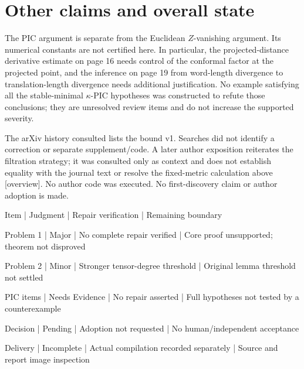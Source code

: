 \documentclass[10pt]{article}
\begin{document}
\section*{Other claims and overall state}
The PIC argument is separate from the Euclidean \(Z\)-vanishing argument. Its numerical constants are not certified here. In particular, the projected-distance derivative estimate on page 16 needs control of the conformal factor at the projected point, and the inference on page 19 from word-length divergence to translation-length divergence needs additional justification. No example satisfying all the stable-minimal \(\kappa\)-PIC hypotheses was constructed to refute those conclusions; they are unresolved review items and do not increase the supported severity.\par
The arXiv history consulted lists the bound v1. Searches did not identify a correction or separate supplement/code. A later author exposition reiterates the filtration strategy; it was consulted only as context and does not establish equality with the journal text or resolve the fixed-metric calculation above [overview]. No author code was executed. No first-discovery claim or author adoption is made.\par
Item | Judgment | Repair verification | Remaining boundary\par
Problem 1 | Major | No complete repair verified | Core proof unsupported; theorem not disproved\par
Problem 2 | Minor | Stronger tensor-degree threshold | Original lemma threshold not settled\par
PIC items | Needs Evidence | No repair asserted | Full hypotheses not tested by a counterexample\par
Decision | Pending | Adoption not requested | No human/independent acceptance\par
Delivery | Incomplete | Actual compilation recorded separately | Source and report image inspection\par
\end{document}
